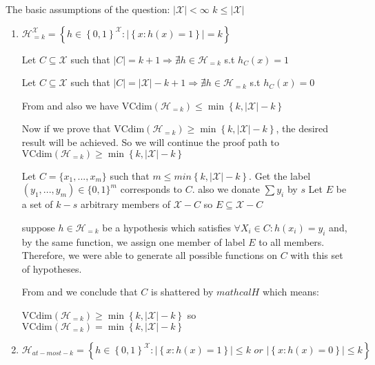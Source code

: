 \documentclass[]{book}
\begin{document}
The basic assumptions of the question: \hspace{1cm} $|\mathcal{X}|<	\infty$ \hspace{1cm} $k\leq |\mathcal{X}|$
\begin{enumerate}
    \item $\mathcal{H}^\mathcal{X}_{=k}=\left \{ h\in\left \{ 0,1 \right \}^\mathcal{X} :|  \left \{ x:h(x)=1 \right \} |=k \right \}$
    
    Let $C\subseteq \mathcal{X}  $ such that $|C|=k+1 \Rightarrow \nexists h\in \mathcal{H}_{=k}$ s.t $h_C(x)=1$ \hspace{1.34 cm} 
    
    Let $C\subseteq \mathcal{X}  $ such that $|C|=|\mathcal{X}|-k+1 \Rightarrow \nexists h\in \mathcal{H}_{=k}$ s.t $h_C(x)=0$ \hspace{0.5 cm} 
    
    From  and also  we have $\text{VCdim}(\mathcal{H}_{=k})\leq\min\left \{ k,|\mathcal{X}|-k \right \}$
    
    Now if we prove that $\text{VCdim}(\mathcal{H}_{=k})\geq\min\left \{ k,|\mathcal{X}|-k \right \}$, the desired result will be achieved. So we will continue the proof path to $\text{VCdim}(\mathcal{H}_{=k})\geq\min\left \{ k,|\mathcal{X}|-k \right \}$
    
    Let $C=\{x_1,...,x_m\}$ such that $m\leq min\left \{ k,|\mathcal{X}|-k \right \}$. 
    Get the label $(y_1,...,y_m)\in \{0,1\}^m$ corresponds to $C$. also we donate $\sum y_i$ by $s$
    Let $E$ be a set of $k-s$ arbitrary members of $\mathcal{X}-C$ so $E\subseteq\mathcal{X}-C$ 
    
    suppose $h\in \mathcal{H}_{=k}$ be a  hypothesis which satisfies $\forall X_i \in C:h(x_i)=y_i$ and, by the same function, we assign one member of label $E$ to all members. Therefore, we were able to generate all possible functions on $C$ with this set of hypotheses. 
    
    From  and  we conclude that $C$ is shattered by $mathcal{H}$ which means:
    
    $\text{VCdim}(\mathcal{H}_{=k})\geq\min\left \{ k,|\mathcal{X}|-k \right \}$ so $\text{VCdim}(\mathcal{H}_{=k})=\min\left \{ k,|\mathcal{X}|-k \right \}$ 
    \item $\mathcal{H}_{at-most-k}=\left \{ h\in \left \{ 0,1 \right \}^\mathcal{X}: \left | \left \{ x:h(x)=1 \right \} \right |\leq k \,\,or\,\,\left | \left \{ x:h(x)=0 \right \} \right |\leq k \right \}$
    

\end{enumerate}
\end{document}
